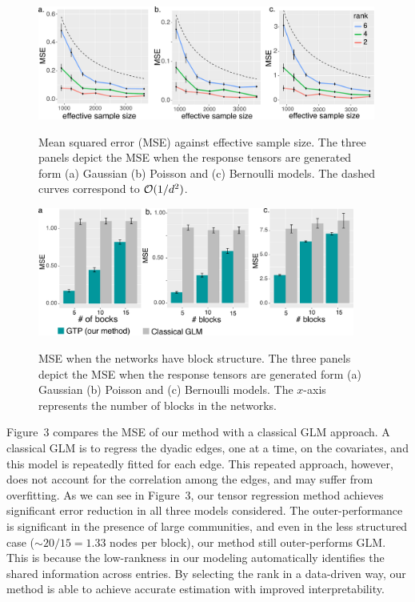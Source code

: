 \documentclass{article}
\theoremstyle{plain}
\theoremstyle{definition}
\begin{document}
\begin{figure}[h]
\begin{minipage}[b]{0.47\textwidth}

    \centering
    \includegraphics[width=0.99\textwidth]{dimension.pdf}\label{fig:dim}
    \caption{Mean squared error (MSE) against effective sample size. The three panels depict the MSE when the response tensors are generated form (a) Gaussian (b) Poisson and (c) Bernoulli models. The dashed curves correspond to $\mathcal{O}({1/d^2})$.}

\end{minipage}
\hspace{.5cm}
\begin{minipage}[b]{0.47\textwidth}

   \centering
    \includegraphics[width=0.93\textwidth]{comparison.pdf}\label{fig:glm}
    \vspace{-.2cm}
    \caption{MSE when the networks have block structure. The three panels depict the MSE when the response tensors are generated form (a) Gaussian (b) Poisson and (c) Bernoulli models. The $x$-axis represents the number of blocks in the networks.}

\end{minipage}
\vspace{-.2cm}
\end{figure}



Figure~3 compares the MSE of our method with a classical GLM approach. A classical GLM is to regress the dyadic edges, one at a time, on the covariates, and this model is repeatedly fitted for each edge. This repeated approach, however, does not account for the correlation among the edges, and may suffer from overfitting. As we can see in Figure~3, our tensor regression method achieves significant error reduction in all three models considered. The outer-performance is significant in the presence of large communities, and even in the less structured case ($\sim 20/15=1.33$ nodes per block), our method still outer-performs GLM. This is because the low-rankness in our modeling automatically identifies the shared information across entries. By selecting the rank in a data-driven way, our method is able to achieve accurate estimation with improved interpretability. 
\end{document}
